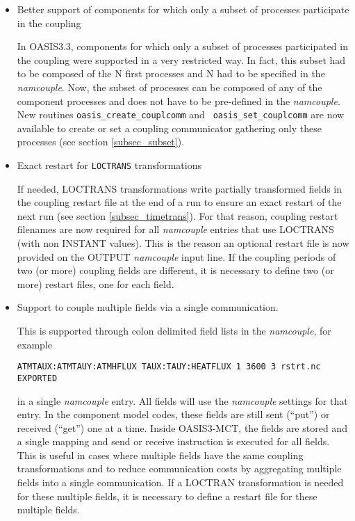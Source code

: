 \begin{itemize}

\item Better support of components for which only a subset of processes
  participate in the coupling

In OASIS3.3, components for which only a subset of processes
  participated in the coupling were supported in a very restricted
  way. In fact, this subset had to be composed of the N first
  processes and N had to be specified in the {\it namcouple}. Now, the
  subset of processes can be composed of any of the component
  processes and does not have to be pre-defined in the {\it
    namcouple}. New routines {\tt oasis\_create\_couplcomm} and {\tt
  oasis\_set\_couplcomm} are now available to create or set a coupling
  communicator gathering only these processes (see section \ref{subsec_subset}).

\item Exact restart for {\tt LOCTRANS} transformations

If needed, LOCTRANS transformations write partially
  transformed fields  in the coupling restart file at the end of a run
  to ensure an exact restart of the next run (see section
  \ref{subsec_timetrans}). For that
  reason, coupling restart filenames are now required for all {\it
    namcouple} entries that use LOCTRANS (with non INSTANT
  values). This is the reason an optional restart file is now provided
  on the OUTPUT {\it namcouple} input line. If the coupling periods of
  two (or more) coupling fields are different, it is necessary to define 
  two (or more) restart files, one for each field.

\item Support to couple multiple fields via a single communication.

 This is supported through colon
delimited field lists in the {\it namcouple}, for example 

{\tt ATMTAUX:ATMTAUY:ATMHFLUX  TAUX:TAUY:HEATFLUX 1 3600 3 rstrt.nc EXPORTED}

 in a single {\it namcouple} entry. All fields will use the
{\it namcouple} settings for that entry. In the component model codes,
these fields are still sent (``put'') or received (``get'') one at a
time. Inside OASIS3-MCT, the fields are stored and a single mapping
and send or receive instruction is executed for all fields. This is
useful in cases where multiple fields have the same coupling
transformations and to reduce communication costs by aggregating multiple 
fields into a single communication. If a LOCTRAN transformation is needed
for these multiple fields, it is necessary to define a restart file for 
these multiple fields.


\end{itemize}
